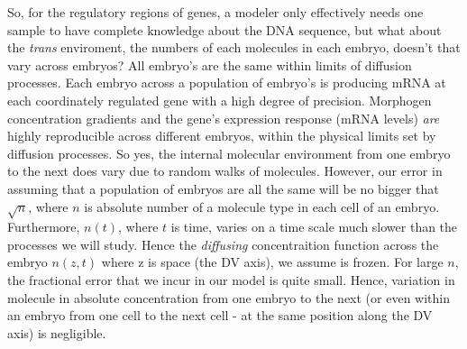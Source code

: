 So, for the regulatory regions of genes, a modeler only effectively needs one sample to have complete knowledge about the DNA sequence, but what about the \emph{trans} enviroment, the numbers of each molecules in each embryo, doesn't that vary across embryos?  All embryo's are the same within limits of diffusion processes.  Each embryo across a population of embryo's is producing mRNA at each coordinately regulated gene with a high degree of precision.  Morphogen concentration gradients and the gene's expression response (mRNA levels) \emph{are} highly reproducible across different embryos, within the physical limits set by diffusion processes\cite{pmid17632062}.  So yes, the internal molecular environment from one embryo to the next does vary due to random walks of molecules.  However, our error in assuming that a population of embryos are all the same will be no bigger that $\sqrt{n}$, where $n$ is absolute number of a molecule type in each cell of an embryo.  Furthermore, $n(t)$, where $t$ is time, varies on a time scale much slower than the processes we will study.  Hence the \emph{diffusing} concentraition function across the embryo $n(z,t)$ where z is space (the DV axis), we assume is frozen.  For large $n$, the fractional error that we incur in our model is quite small.  Hence, variation in molecule in absolute concentration from one embryo to the next (or even within an embryo from one cell to the next cell - at the same position along the DV axis) is negligible.

